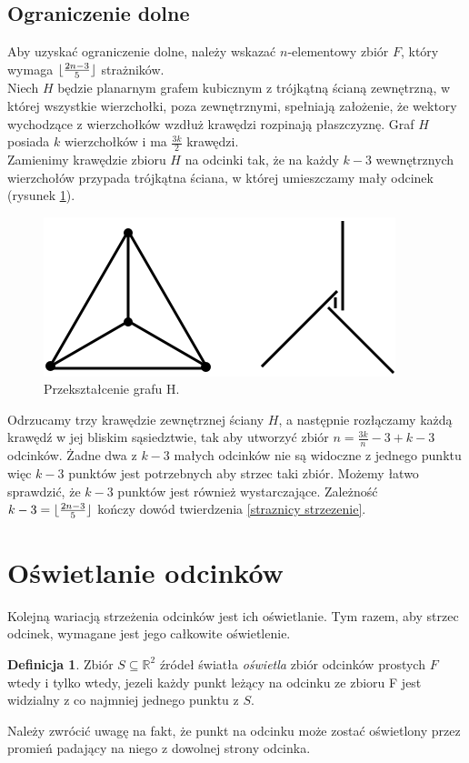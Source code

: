 \documentclass[brudnopis]{xmgr}
\DeclarePairedDelimiter\floor{\lfloor}{\rfloor}
\theoremstyle{definition}
\newtheorem{Definicja}{Definicja}
\begin{document}
\subsection{Ograniczenie dolne}
\indent Aby uzyskać ograniczenie dolne, należy wskazać $n$-elementowy zbiór $F$, który wymaga $\floor{\frac{2n-3}{5}}$ strażników.
\\\indent Niech $H$ będzie planarnym grafem kubicznym z trójkątną ścianą zewnętrzną, w której wszystkie wierzchołki, poza zewnętrznymi, spełniają założenie, że wektory wychodzące z wierzchołków wzdłuż krawędzi rozpinają płaszczyznę. Graf $H$ posiada $k$ wierzchołków i ma $\frac{3k}{2}$ krawędzi.
\\\indent Zamienimy krawędzie zbioru $H$ na odcinki tak, że na każdy $k - 3$ wewnętrznych wierzchołów przypada trójkątna ściana, w której umieszczamy mały odcinek (rysunek \ref{fig:przeksztalcenie h}).
\begin{figure}[ht!]
 \centering
  \includegraphics{rysunki/dolna_granica.png}
  \caption{Przekształcenie grafu H.}
  \label{fig:przeksztalcenie h}
\end{figure} 
Odrzucamy trzy krawędzie zewnętrznej ściany $H$, a następnie rozłączamy każdą krawędź w jej bliskim sąsiedztwie, tak aby utworzyć zbiór $n = \frac{3k}{n} - 3 + k  - 3$ odcinków. Żadne dwa z $k - 3$ małych odcinków nie są widoczne z jednego punktu więc $k - 3$ punktów jest potrzebnych aby strzec taki zbiór. Możemy łatwo sprawdzić, że $k - 3$ punktów jest również wystarczające. Zależność $k - 3 = \floor{\frac{2n - 3}{5}}$ kończy dowód twierdzenia \ref{straznicy strzezenie}.

\section{Oświetlanie odcinków}\label{oświetlanie odcinków}
Kolejną wariacją strzeżenia odcinków jest ich oświetlanie. Tym razem, aby strzec odcinek, wymagane jest jego całkowite oświetlenie.
\begin{Definicja}
	Zbiór $S \subseteq \mathbb{R}^2$ źródeł światła  \emph{oświetla} zbiór odcinków prostych $F$ wtedy i tylko wtedy, jezeli każdy punkt leżący na odcinku ze zbioru F jest widzialny z co najmniej jednego punktu z $S$.
\end{Definicja} Należy zwrócić uwagę na fakt, że punkt na odcinku może zostać oświetlony przez promień padający na niego z dowolnej strony odcinka.
\end{document}
